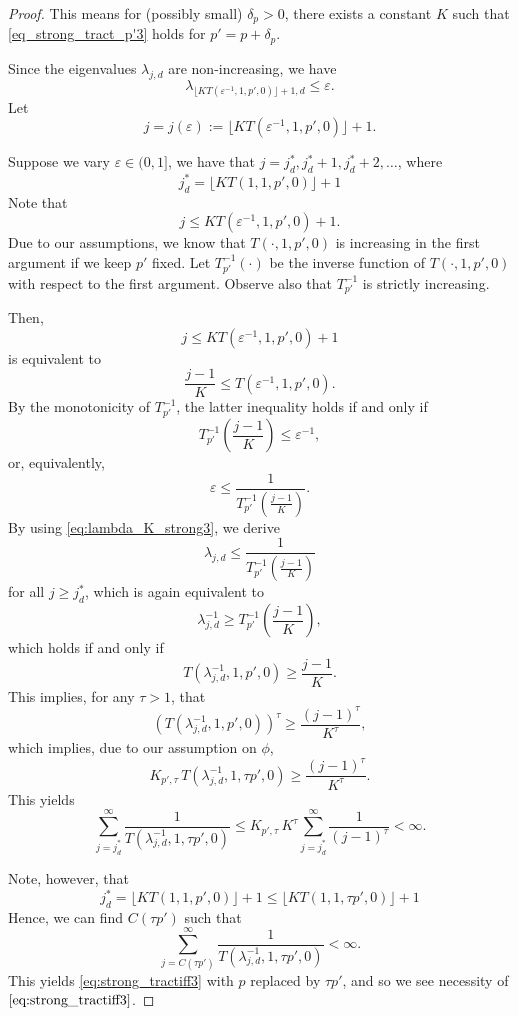 \documentclass[11pt,a4paper]{article}
\begin{document}
{\begin{proof}
\noindent This means for (possibly small) $\delta_p>0$, there exists a constant $K$ such that \eqref{eq_strong_tract_p'3} holds for $p'=p+\delta_p$.

Since the eigenvalues $\lambda_{j,d}$ are non-increasing, we have
\begin{equation}\label{eq:lambda_K_strong3}
\lambda_{\lfloor K T(\varepsilon^{-1},1,p',0)\rfloor +1,d}\le \varepsilon.
\end{equation}
Let
\[
j=j (\varepsilon):= \lfloor K T(\varepsilon^{-1},1,p',0)\rfloor +1.
\]

Suppose we vary $\varepsilon\in (0,1]$, we have that $j=j_d^*, j_d^*+1, j_d^*+2,\ldots$, where 
\[
  j_d^*=\lfloor K T(1,1,p',0)\rfloor +1
\]
Note that
\[
j\le K T(\varepsilon^{-1},1,p',0)+1.
\]
Due to our assumptions, we know that 
$T(\cdot,1, p',0)$ is increasing in the first argument if 
we keep $p'$ fixed. Let $T_{p'}^{-1} (\cdot)$ be the inverse function of $T (\cdot,1, p',0)$ with respect to the first argument. Observe also that $T_{p'}^{-1}$ is strictly increasing. 


Then, 
\[
j \le K T(\varepsilon^{-1},1,p',0)+1
\]
is equivalent to
\[
\frac{j-1}{K} \le T(\varepsilon^{-1},1,p',0).
\]
By the monotonicity of $T_{p'}^{-1}$, the latter inequality holds if and only if
\[
  T_{p'}^{-1} \left(\frac{j-1}{K} \right)
  \le \varepsilon^{-1},
\]
or, equivalently,
\[
 \varepsilon \le \frac{1}{T_{p'}^{-1} \left(\frac{j-1}{K} \right)}.
\]
By using \eqref{eq:lambda_K_strong3}, we derive
\[
 \lambda_{j,d}\le \frac{1}{T_{p'}^{-1} \left(\frac{j-1}{K} \right)}
\]
for all $j\ge j_d^*$, which is again equivalent to 
\[
\lambda_{j,d}^{-1}\ge T_{p'}^{-1} \left(\frac{j-1}{K} \right),
\]
which holds if and only if
\[ 
 T(\lambda_{j,d}^{-1},1, p',0) \ge \frac{j-1}{K}.
\]
This implies, for any $\tau>1$, that 
\[ 
 (T(\lambda_{j,d}^{-1},1, p',0))^\tau \ge \frac{(j-1)^\tau}{K^\tau },
\]
which implies, due to our assumption on $\phi$, 
\[ 
 K_{p',\tau}\,T (\lambda_{j,d}^{-1},1,\tau p',0) \ge \frac{(j-1)^\tau}{K^\tau }.
\]
This yields
\[
\sum_{j=j_d^*}^\infty \frac{1}{T (\lambda_{j,d}^{-1},1, \tau p',0)} \le K_{p',\tau}\, K^\tau \sum_{j=j_d^*}^\infty \frac{1}{(j-1)^\tau}<\infty.
\]

Note, however, that 
\[
 j_d^* = \lfloor K T(1,1,p',0)\rfloor +1 \le \lfloor K T(1,1,\tau p',0)\rfloor +1
\]
Hence, we can find $C(\tau p')$ such that 
\[
 \sum_{j=C(\tau p')}^\infty \frac{1}{T(\lambda_{j,d}^{-1},1, \tau p',0)}<\infty.
\]
This yields \eqref{eq:strong_tractiff3} with $p$ replaced by $\tau p'$, and so we see necessity of $\eqref{eq:strong_tractiff3}$. 




\end{proof}}
\end{document}
